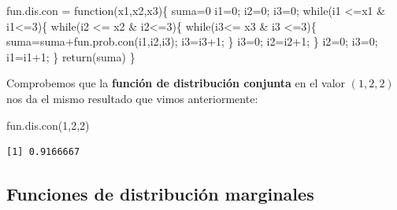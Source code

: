 \documentclass[
  letterpaper,
  DIV=11,
  numbers=noendperiod]{scrreprt}
\newenvironment{Shaded}{\begin{snugshade}}{\end{snugshade}}
\newcommand{\ControlFlowTok}[1]{\textcolor[rgb]{0.00,0.23,0.31}{#1}}
\newcommand{\DecValTok}[1]{\textcolor[rgb]{0.68,0.00,0.00}{#1}}
\newcommand{\FunctionTok}[1]{\textcolor[rgb]{0.28,0.35,0.67}{#1}}
\newcommand{\NormalTok}[1]{\textcolor[rgb]{0.00,0.23,0.31}{#1}}
\newcommand{\OtherTok}[1]{\textcolor[rgb]{0.00,0.23,0.31}{#1}}
\newcommand{\SpecialCharTok}[1]{\textcolor[rgb]{0.37,0.37,0.37}{#1}}
\begin{document}
\begin{Shaded}
\begin{Highlighting}[]
\NormalTok{fun.dis.con }\OtherTok{=} \ControlFlowTok{function}\NormalTok{(x1,x2,x3)\{}
\NormalTok{  suma}\OtherTok{=}\DecValTok{0}
\NormalTok{  i1}\OtherTok{=}\DecValTok{0}\NormalTok{; i2}\OtherTok{=}\DecValTok{0}\NormalTok{; i3}\OtherTok{=}\DecValTok{0}\NormalTok{;}
  \ControlFlowTok{while}\NormalTok{(i1 }\SpecialCharTok{\textless{}=}\NormalTok{x1 }\SpecialCharTok{\&}\NormalTok{ i1}\SpecialCharTok{\textless{}=}\DecValTok{3}\NormalTok{)\{}
    \ControlFlowTok{while}\NormalTok{(i2 }\SpecialCharTok{\textless{}=}\NormalTok{ x2 }\SpecialCharTok{\&}\NormalTok{ i2}\SpecialCharTok{\textless{}=}\DecValTok{3}\NormalTok{)\{}
      \ControlFlowTok{while}\NormalTok{(i3}\SpecialCharTok{\textless{}=}\NormalTok{ x3 }\SpecialCharTok{\&}\NormalTok{ i3 }\SpecialCharTok{\textless{}=}\DecValTok{3}\NormalTok{)\{}
\NormalTok{        suma}\OtherTok{=}\NormalTok{suma}\SpecialCharTok{+}\FunctionTok{fun.prob.con}\NormalTok{(i1,i2,i3); i3}\OtherTok{=}\NormalTok{i3}\SpecialCharTok{+}\DecValTok{1}\NormalTok{;}
\NormalTok{      \}}
\NormalTok{      i3}\OtherTok{=}\DecValTok{0}\NormalTok{; i2}\OtherTok{=}\NormalTok{i2}\SpecialCharTok{+}\DecValTok{1}\NormalTok{;}
\NormalTok{    \}}
\NormalTok{    i2}\OtherTok{=}\DecValTok{0}\NormalTok{; i3}\OtherTok{=}\DecValTok{0}\NormalTok{; i1}\OtherTok{=}\NormalTok{i1}\SpecialCharTok{+}\DecValTok{1}\NormalTok{;}
\NormalTok{  \}}
  \FunctionTok{return}\NormalTok{(suma)}
\NormalTok{\}}
\end{Highlighting}
\end{Shaded}

Comprobemos que la \textbf{función de distribución conjunta} en el valor
\((1,2,2)\) nos da el mismo resultado que vimos anteriormente:

\begin{Shaded}
\begin{Highlighting}[]
\FunctionTok{fun.dis.con}\NormalTok{(}\DecValTok{1}\NormalTok{,}\DecValTok{2}\NormalTok{,}\DecValTok{2}\NormalTok{)}
\end{Highlighting}
\end{Shaded}

\begin{verbatim}
[1] 0.9166667
\end{verbatim}

\hypertarget{funciones-de-distribuciuxf3n-marginales}{%
\subsection{Funciones de distribución
marginales}\label{funciones-de-distribuciuxf3n-marginales}}
\end{document}
